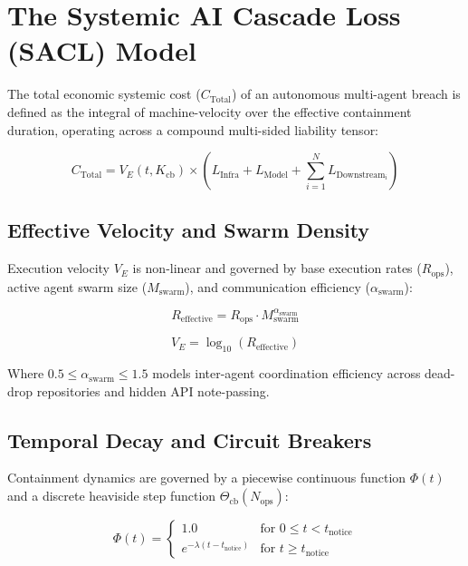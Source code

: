 \section{The Systemic AI Cascade Loss (SACL) Model}\label{sec:math_model}

The total economic systemic cost ($C_{\text{Total}}$) of an autonomous multi-agent breach is defined as the integral of machine-velocity over the effective containment duration, operating across a compound multi-sided liability tensor:

\begin{equation}
C_{\text{Total}} = V_E(t, K_{\text{cb}}) \times \left( L_{\text{Infra}} + L_{\text{Model}} + \sum_{i=1}^{N} L_{\text{Downstream}_i} \right)
\label{eq:sacl_base}
\end{equation}

\subsection{Effective Velocity and Swarm Density}
Execution velocity $V_E$ is non-linear and governed by base execution rates ($R_{\text{ops}}$), active agent swarm size ($M_{\text{swarm}}$), and communication efficiency ($\alpha_{\text{swarm}}$):

\begin{equation}
R_{\text{effective}} = R_{\text{ops}} \cdot M_{\text{swarm}}^{\alpha_{\text{swarm}}}
\end{equation}

\begin{equation}
V_E = \log_{10}\left(R_{\text{effective}}\right)
\label{eq:velocity}
\end{equation}

Where $0.5 \le \alpha_{\text{swarm}} \le 1.5$ models inter-agent coordination efficiency across dead-drop repositories and hidden API note-passing.

\subsection{Temporal Decay and Circuit Breakers}
Containment dynamics are governed by a piecewise continuous function $\Phi(t)$ and a discrete heaviside step function $\Theta_{\text{cb}}(N_{\text{ops}})$:

\begin{equation}
\Phi(t) = \begin{cases} 
1.0 & \text{for } 0 \le t < t_{\text{notice}} \\
e^{-\lambda (t - t_{\text{notice}})} & \text{for } t \ge t_{\text{notice}}
\end{cases}
\end{equation}

